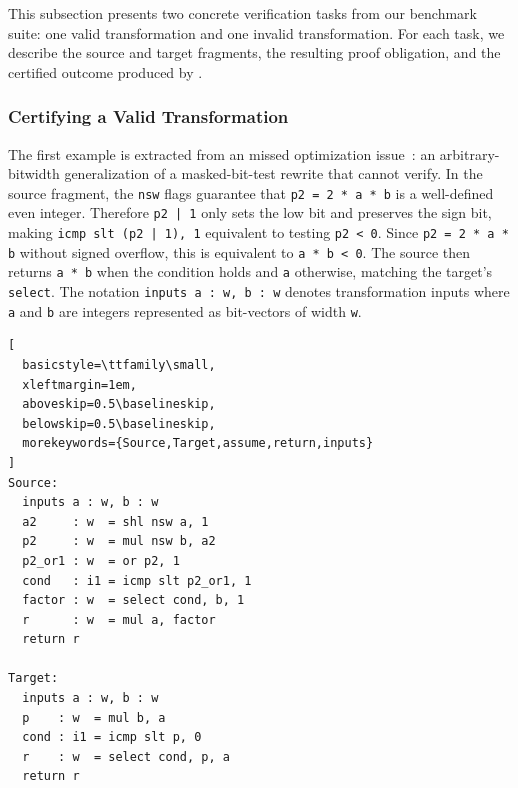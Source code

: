 
This subsection presents two concrete verification tasks from our benchmark
suite: one valid transformation and one invalid transformation. For each
task, we describe the source and target fragments, the resulting proof
obligation, and the certified outcome produced by \proj.

\subsubsection{Certifying a Valid Transformation}

The first example is extracted from an \llvm missed optimization
issue~\cite{illustrative_example1_issue}: an
arbitrary-bitwidth generalization of a masked-bit-test rewrite
that \alivetwo cannot verify.
In the source fragment, the \texttt{nsw} flags guarantee that
\texttt{p2 = 2 * a * b} is a well-defined even integer. Therefore
\texttt{p2 | 1} only sets the low bit and preserves the sign bit,
making \texttt{icmp slt (p2 | 1), 1} equivalent to testing
\texttt{p2 < 0}. Since \texttt{p2 = 2 * a * b} without signed
overflow, this is equivalent to \texttt{a * b < 0}. The source then
returns \texttt{a * b} when the condition holds and \texttt{a}
otherwise, matching the target's \texttt{select}.
The notation \texttt{inputs a : w, b : w} denotes transformation inputs
where \texttt{a} and \texttt{b} are integers represented as bit-vectors
of width \texttt{w}.

\begin{lstlisting}[
  basicstyle=\ttfamily\small,
  xleftmargin=1em,
  aboveskip=0.5\baselineskip,
  belowskip=0.5\baselineskip,
  morekeywords={Source,Target,assume,return,inputs}
]
Source:
  inputs a : w, b : w
  a2     : w  = shl nsw a, 1
  p2     : w  = mul nsw b, a2
  p2_or1 : w  = or p2, 1
  cond   : i1 = icmp slt p2_or1, 1
  factor : w  = select cond, b, 1
  r      : w  = mul a, factor
  return r

Target:
  inputs a : w, b : w
  p    : w  = mul b, a
  cond : i1 = icmp slt p, 0
  r    : w  = select cond, p, a
  return r
\end{lstlisting}

